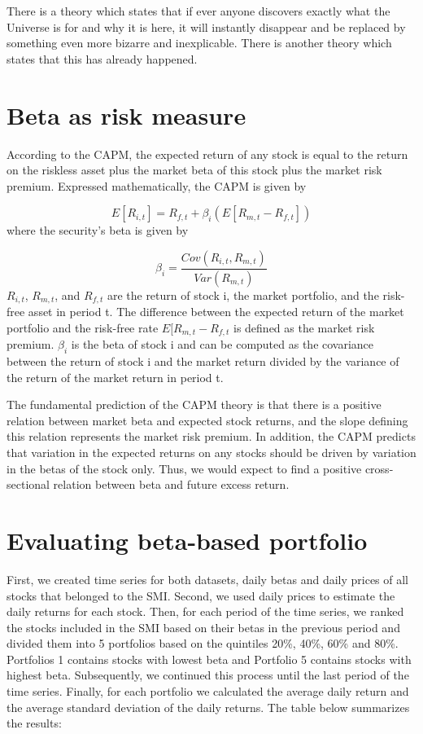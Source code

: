 \documentclass[12pt,a4paper,abstracton,fleqn]{article}
\begin{document}
There is a theory which states that if ever anyone discovers exactly what the Universe is for and why it is here, it will instantly disappear and be replaced by something even more bizarre and inexplicable.
There is another theory which states that this has already happened.


\section{Beta as risk measure}
\begin{justify}
According to the CAPM, the expected return of any stock is equal to the return on the riskless asset plus the market beta of this stock plus the market risk premium. Expressed mathematically, the CAPM is given by

\begin{equation}
    E[R_{i,t}]=R_{f,t}+\beta_{i}(E[R_{m,t}-R_{f,t}])
\end{equation}
where the security’s beta is given by


\begin{equation}
     \beta_{i}=\frac{Cov(R_{i,t},R_{m,t})}{Var(R_{m,t})} 
\end{equation}
$R_{i,t}$, $R_{m,t}$, and $R_{f,t}$ are the return of stock i, the market portfolio, and the risk-free asset in period t. The difference between the expected return of the market portfolio and the risk-free rate $E[R_{m,t}-R_{f,t}$ is defined as the market risk premium. $\beta_{i}$ is the beta of stock i and can be computed as the covariance between the return of stock i and the market return divided by the variance of the return of the market return in period t.
 
The fundamental prediction of the CAPM theory is that there is a positive relation between market beta and expected stock returns, and the slope defining this relation represents the market risk premium. In addition, the CAPM predicts that variation in the expected returns on any stocks should be  driven by variation in the betas of the stock only. Thus, we would expect to find a positive cross-sectional relation between beta and future excess return.
\end{justify}

\section{Evaluating beta-based portfolio}
First, we created time series for both datasets, daily betas and daily prices of all stocks that belonged to the SMI. Second, we used daily prices to estimate the daily returns for each stock. Then, for each period of the time series, we ranked the stocks included in the SMI based on their betas in the previous period and divided them into 5 portfolios based on the quintiles 20\%, 40\%, 60\% and 80\%. Portfolios 1 contains stocks with lowest beta and Portfolio 5 contains stocks with highest beta. Subsequently, we continued this process until the last period of the time series. Finally, for each portfolio we calculated the average daily return and the average standard deviation of the daily returns. The table below summarizes the results:
~\\
\end{document}
